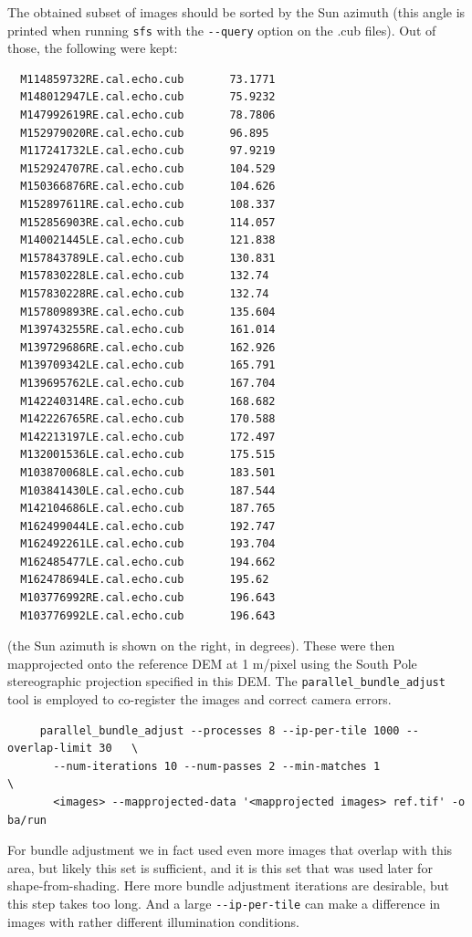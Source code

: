 The obtained subset of images should be sorted by the Sun azimuth (this
angle is printed when running \texttt{sfs} with the \texttt{-\/-query}
option on the .cub files). Out of those, the following were kept:

\begin{verbatim}
  M114859732RE.cal.echo.cub       73.1771
  M148012947LE.cal.echo.cub       75.9232
  M147992619RE.cal.echo.cub       78.7806
  M152979020RE.cal.echo.cub       96.895
  M117241732LE.cal.echo.cub       97.9219
  M152924707RE.cal.echo.cub       104.529
  M150366876RE.cal.echo.cub       104.626
  M152897611RE.cal.echo.cub       108.337
  M152856903RE.cal.echo.cub       114.057
  M140021445LE.cal.echo.cub       121.838
  M157843789LE.cal.echo.cub       130.831
  M157830228LE.cal.echo.cub       132.74
  M157830228RE.cal.echo.cub       132.74
  M157809893RE.cal.echo.cub       135.604
  M139743255RE.cal.echo.cub       161.014
  M139729686RE.cal.echo.cub       162.926
  M139709342LE.cal.echo.cub       165.791
  M139695762LE.cal.echo.cub       167.704
  M142240314RE.cal.echo.cub       168.682
  M142226765RE.cal.echo.cub       170.588
  M142213197LE.cal.echo.cub       172.497
  M132001536LE.cal.echo.cub       175.515
  M103870068LE.cal.echo.cub       183.501
  M103841430LE.cal.echo.cub       187.544
  M142104686LE.cal.echo.cub       187.765
  M162499044LE.cal.echo.cub       192.747
  M162492261LE.cal.echo.cub       193.704
  M162485477LE.cal.echo.cub       194.662
  M162478694LE.cal.echo.cub       195.62
  M103776992RE.cal.echo.cub       196.643
  M103776992LE.cal.echo.cub       196.643
\end{verbatim}

(the Sun azimuth is shown on the right, in degrees). These were then mapprojected
onto the reference DEM at 1 m/pixel using the South Pole stereographic
projection specified in this DEM. The \texttt{parallel\_bundle\_adjust}
tool is employed to co-register the images and correct camera errors. 

\begin{verbatim}
     parallel_bundle_adjust --processes 8 --ip-per-tile 1000 --overlap-limit 30   \
       --num-iterations 10 --num-passes 2 --min-matches 1                         \
       <images> --mapprojected-data '<mapprojected images> ref.tif' -o ba/run
\end{verbatim}

For bundle adjustment we in fact used even more images that overlap
with this area, but likely this set is sufficient, and it is this set
that was used later for shape-from-shading. 
Here more bundle
adjustment iterations are desirable, but this step takes too long. And a large
\texttt{-\/-ip-per-tile} can make a difference in images with rather
different illumination conditions. 

